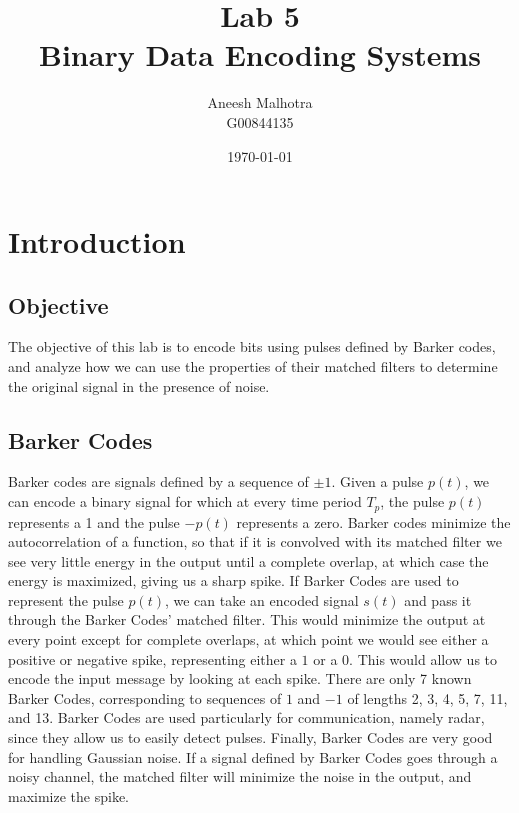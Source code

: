 \documentclass{article}
\title{Lab 5 \\ Binary Data Encoding Systems} %
\author{Aneesh Malhotra \\ G00844135} %
\date{\today} %
\begin{document}
\maketitle %




\section{Introduction}

\subsection{Objective}
\begin{description}

The objective of this lab is to encode bits using pulses defined by Barker codes, and analyze how we can use the properties of their matched filters to determine the original signal in the presence of noise. 
\end{description}

\subsection{Barker Codes}
Barker codes are signals defined by a sequence of $\pm 1$. Given a pulse $p(t)$, we can encode a binary signal for which at every time period $T_p$, the pulse $p(t)$ represents a 1 and the pulse $-p(t)$ represents a zero. Barker codes minimize the autocorrelation of a function, so that if it is convolved with its matched filter we see very little energy in the output until a complete overlap, at which case the energy is maximized, giving us a sharp spike.  If Barker Codes are used to represent the pulse $p(t)$, we can take an encoded signal $s(t)$ and pass it through the Barker Codes' matched filter. This would minimize the output at every point except for complete overlaps, at which point we would see either a positive or negative spike, representing either a $1$ or a $0$. This would allow us to encode the input message by looking at each spike. There are only 7 known Barker Codes, corresponding to sequences of $1$ and $-1$ of lengths 2, 3, 4, 5, 7, 11, and 13. Barker Codes are used particularly for communication, namely radar, since they allow us to easily detect pulses. Finally, Barker Codes are very good for handling Gaussian noise. If a signal defined by Barker Codes goes through a noisy channel, the matched filter will minimize the noise in the output, and maximize the spike.
\end{document}
